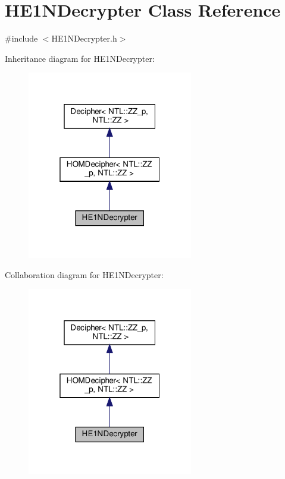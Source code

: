 \hypertarget{classHE1NDecrypter}{}\section{H\+E1\+N\+Decrypter Class Reference}
\label{classHE1NDecrypter}


{\ttfamily \#include $<$H\+E1\+N\+Decrypter.\+h$>$}



Inheritance diagram for H\+E1\+N\+Decrypter\+:
\nopagebreak
\begin{figure}[H]
\begin{center}
\leavevmode
\includegraphics[width=205pt]{classHE1NDecrypter__inherit__graph}
\end{center}
\end{figure}


Collaboration diagram for H\+E1\+N\+Decrypter\+:
\nopagebreak
\begin{figure}[H]
\begin{center}
\leavevmode
\includegraphics[width=205pt]{classHE1NDecrypter__coll__graph}
\end{center}
\end{figure}
